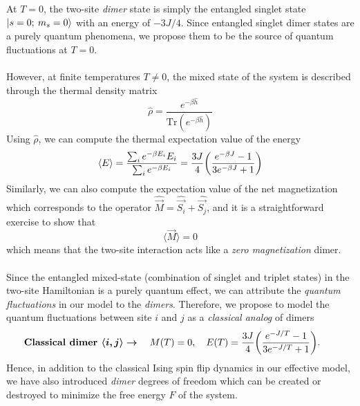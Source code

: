 \documentclass[../journal_main.tex]{subfiles}
\begin{document}
At $T=0$, the two-site \textit{dimer} state is simply the entangled singlet state $\ket{s = 0; \: m_s = 0}$ with an energy of $-3J/4$. Since entangled singlet dimer states are a purely quantum phenomena, we propose them to be the source of quantum fluctuations at $T = 0$.~\\~\\
However, at finite temperatures $T \neq 0$, the mixed state of the system is described through the thermal density matrix 
\begin{equation}
    \hat{\rho} = \frac{e^{-\beta \hat{h}}}{\text{Tr} (e^{-\beta \hat{h}})}
\end{equation}
Using $\hat{\rho}$, we can compute the thermal expectation value of the energy 
\begin{equation}
    \expval{E} = \frac{\sum_i e^{-\beta E_i} E_i}{\sum_i e^{-\beta E_i}} = \frac{3J}{4}\qty(\frac{e^{-\beta J} - 1}{3e^{-\beta J} + 1})
\end{equation}
Similarly, we can also compute the expectation value of the net magnetization which corresponds to the operator $\hat{\vec{M}} = \hat{\vec{S_i}} + \hat{\vec{S_j}}$, and it is a straightforward exercise to show that
\begin{equation}
    \langle\vec{M}\rangle = 0 
\end{equation}
which means that the two-site interaction acts like a \textit{zero magnetization} dimer.~\\~\\
Since the entangled mixed-state (combination of singlet and triplet states) in the two-site Hamiltonian is a purely quantum effect, we can attribute the \textit{quantum fluctuations} in our model to the \textit{dimers}. Therefore, we propose to model the quantum fluctuations between site $i$ and $j$ as a \textit{classical analog} of dimers 
\[
    \text{ \textbf{Classical dimer }} \boldsymbol{\langle i,j\rangle \rightarrow} \quad M(T)=0, \quad E(T) = \frac{3J}{4}\qty(\frac{e^{-J/T} - 1}{3e^{-J/T} + 1}). \qquad
\]
Hence, in addition to the classical Ising spin flip dynamics in our effective model, we have also introduced \textit{dimer} degrees of freedom which can be created or destroyed to minimize the free energy $F$ of the system.  
\end{document}
